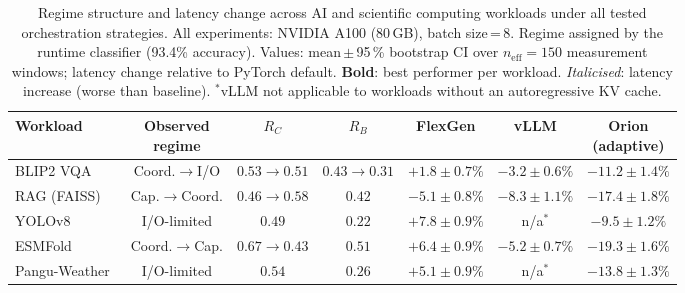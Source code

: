 \begin{table}[t]
\centering
\caption{Regime structure and latency change across AI and scientific computing
         workloads under all tested orchestration strategies.
         All experiments: NVIDIA A100 (80\,GB), batch size\,=\,8.
         Regime assigned by the runtime classifier (93.4\% accuracy).
         Values: mean\,$\pm$\,95\,\% bootstrap CI over
         $n_{\mathrm{eff}}\!=\!150$ measurement windows;
         latency change relative to PyTorch default.
         \textbf{Bold}: best performer per workload.
         \emph{Italicised}: latency increase (worse than baseline).
         $^{*}$vLLM not applicable to workloads without an autoregressive
         KV cache.}
\label{tab:generality}
\renewcommand{\arraystretch}{1.2}
\footnotesize
\begin{tabular}{lcccccc}
\toprule
\textbf{Workload} &
  \makecell{\textbf{Observed}\\\textbf{regime}} &
  $R_C$ & $R_B$ &
  \textbf{FlexGen} &
  \textbf{vLLM} &
  \makecell{\textbf{Orion}\\\textbf{(adaptive)}} \\
\midrule
BLIP2 VQA
  & Coord.$\to$I/O
  & $0.53\!\to\!0.51$ & $0.43\!\to\!0.31$
  & $\mathit{+1.8 \pm 0.7\%}$
  & $-3.2 \pm 0.6\%$
  & $\mathbf{-11.2 \pm 1.4\%}$ \\
RAG (FAISS)
  & Cap.$\to$Coord.
  & $0.46\!\to\!0.58$ & $0.42$
  & $-5.1 \pm 0.8\%$
  & $-8.3 \pm 1.1\%$
  & $\mathbf{-17.4 \pm 1.8\%}$ \\
YOLOv8
  & I/O-limited
  & $0.49$ & $0.22$
  & $\mathit{+7.8 \pm 0.9\%}$
  & n/a$^{*}$
  & $\mathbf{-9.5 \pm 1.2\%}$ \\
\midrule
ESMFold~\cite{lin2023evolutionary}
  & Coord.$\to$Cap.
  & $0.67\!\to\!0.43$ & $0.51$
  & $\mathit{+6.4 \pm 0.9\%}$
  & $-5.2 \pm 0.7\%$
  & $\mathbf{-19.3 \pm 1.6\%}$ \\
Pangu-Weather~\cite{bi2023pangu}
  & I/O-limited
  & $0.54$ & $0.26$
  & $\mathit{+5.1 \pm 0.9\%}$
  & n/a$^{*}$
  & $\mathbf{-13.8 \pm 1.3\%}$ \\
\bottomrule
\end{tabular}
\end{table}

